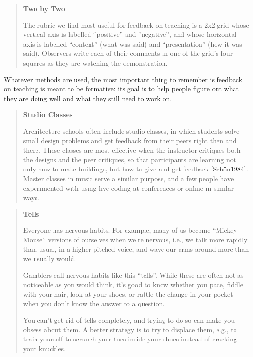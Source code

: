 \documentclass[10pt,statementpaper]{memoir}
\begin{document}
\begin{quote}
\textbf{Two by Two}

The rubric we find most useful for feedback on teaching is a 2x2 grid
whose vertical axis is labelled ``positive'' and ``negative'', and whose
horizontal axis is labelled ``content'' (what was said) and
``presentation'' (how it was said). Observers write each of their
comments in one of the grid's four squares as they are watching the
demonstration.
\end{quote}

Whatever methods are used, the most important thing to remember is
feedback on teaching is meant to be formative: its goal is to help
people figure out what they are doing well and what they still need to
work on.

\begin{quote}
\textbf{Studio Classes}

Architecture schools often include studio classes, in which students
solve small design problems and get feedback from their peers right then
and there. These classes are most effective when the instructor
critiques both the designs and the peer critiques, so that participants
are learning not only how to make buildings, but how to give and get
feedback {[}\href{biblio.html\#schon-practitioner}{Schön1984}{]}. Master
classes in music serve a similar purpose, and a few people have
experimented with using live coding at conferences or online in similar
ways.
\end{quote}

\begin{quote}
\textbf{Tells}

Everyone has nervous habits. For example, many of us become ``Mickey
Mouse'' versions of ourselves when we're nervous, i.e., we talk more
rapidly than usual, in a higher-pitched voice, and wave our arms around
more than we usually would.

Gamblers call nervous habits like this ``tells''. While these are often
not as noticeable as you would think, it's good to know whether you
pace, fiddle with your hair, look at your shoes, or rattle the change in
your pocket when you don't know the answer to a question.

You can't get rid of tells completely, and trying to do so can make you
obsess about them. A better strategy is to try to displace them, e.g.,
to train yourself to scrunch your toes inside your shoes instead of
cracking your knuckles.
\end{quote}
\end{document}
